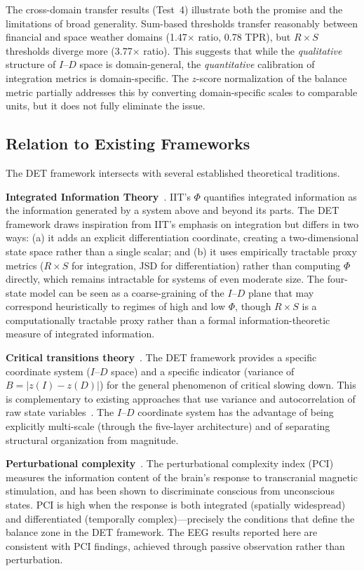 \documentclass[aip,cha,reprint,amsmath,amssymb]{revtex4-2}
\begin{document}
The cross-domain transfer results (Test~4) illustrate both the promise and the limitations of broad generality. Sum-based thresholds transfer reasonably between financial and space weather domains (1.47$\times$ ratio, 0.78 TPR), but $R \times S$ thresholds diverge more (3.77$\times$ ratio). This suggests that while the \emph{qualitative} structure of $I$--$D$ space is domain-general, the \emph{quantitative} calibration of integration metrics is domain-specific. The $z$-score normalization of the balance metric partially addresses this by converting domain-specific scales to comparable units, but it does not fully eliminate the issue.

\subsection{Relation to Existing Frameworks}

The DET framework intersects with several established theoretical traditions.

\textbf{Integrated Information Theory}~\cite{tononi2016}. IIT's $\Phi$ quantifies integrated information as the information generated by a system above and beyond its parts. The DET framework draws inspiration from IIT's emphasis on integration but differs in two ways: (a) it adds an explicit differentiation coordinate, creating a two-dimensional state space rather than a single scalar; and (b) it uses empirically tractable proxy metrics ($R \times S$ for integration, JSD for differentiation) rather than computing $\Phi$ directly, which remains intractable for systems of even moderate size. The four-state model can be seen as a coarse-graining of the $I$--$D$ plane that may correspond heuristically to regimes of high and low $\Phi$, though $R \times S$ is a computationally tractable proxy rather than a formal information-theoretic measure of integrated information.

\textbf{Critical transitions theory}~\cite{scheffer2009,strogatz2015}. The DET framework provides a specific coordinate system ($I$--$D$ space) and a specific indicator (variance of $B = |z(I) - z(D)|$) for the general phenomenon of critical slowing down. This is complementary to existing approaches that use variance and autocorrelation of raw state variables~\cite{dakos2012}. The $I$--$D$ coordinate system has the advantage of being explicitly multi-scale (through the five-layer architecture) and of separating structural organization from magnitude.

\textbf{Perturbational complexity}~\cite{casali2013,sarasso2015}. The perturbational complexity index (PCI) measures the information content of the brain's response to transcranial magnetic stimulation, and has been shown to discriminate conscious from unconscious states. PCI is high when the response is both integrated (spatially widespread) and differentiated (temporally complex)---precisely the conditions that define the balance zone in the DET framework. The EEG results reported here are consistent with PCI findings, achieved through passive observation rather than perturbation.
\end{document}
